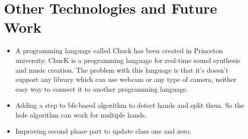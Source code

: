 \chapter{Other Technologies and Future Work}
\begin{itemize}
\item{A programming language called Chuck has been created in Princeton university. ChucK is a programming language for real-time sound synthesis and music creation. The problem with this language is that it's doesn't support any library which can use webcam or any type of camera, neither easy way to connect it to another programming language.}
\item{Adding a step to bfs-based algorithm to detect hands and split them. So the hole algorithm can work for multiple hands.}
\item{Improving second phase part to update class one and zero.}
\end{itemize}





